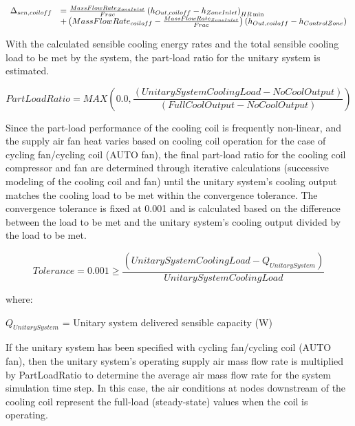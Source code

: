 \begin{equation}
  \begin{array}{rl}
    \Delta_{sen,coil off} &= \frac{MassFlowRate_{ZoneInlet}}{Frac} \PB{h_{Out,coil off} - h_{ZoneInlet}}_{HR\min} \\
                           &+ \PB{MassFlowRate_{coil off} - \frac{MassFlowRate_{ZoneInlet}}{Frac}} \PB{ h_{Out,coil off} - h_{ControlZone}}
  \end{array}
\end{equation}

With the calculated sensible cooling energy rates and the total sensible cooling load to be met by the system, the part-load ratio for the unitary system is estimated.

\begin{equation}
PartLoadRatio = MAX\left( {0.0,\frac{{\left( {UnitarySystemCoolingLoad - NoCoolOutput} \right)}}{{\left( {FullCoolOutput - NoCoolOutput} \right)}}} \right)
\end{equation}

Since the part-load performance of the cooling coil is frequently non-linear, and the supply air fan heat varies based on cooling coil operation for the case of cycling fan/cycling coil (AUTO fan), the final part-load ratio for the cooling coil compressor and fan are determined through iterative calculations (successive modeling of the cooling coil and fan) until the unitary system's cooling output matches the cooling load to be met within the convergence tolerance. The convergence tolerance is fixed at 0.001 and is calculated based on the difference between the load to be met and the unitary system's cooling output divided by the load to be met.

\begin{equation}
Tolerance = 0.001 \ge \frac{{\left( {UnitarySystemCoolingLoad - {Q_{UnitarySystem}}} \right)}}{{UnitarySystemCoolingLoad}}
\end{equation}

where:

\({Q_{UnitarySystem}}\) = Unitary system delivered sensible capacity (W)

If the unitary system has been specified with cycling fan/cycling coil (AUTO fan), then the unitary system's operating supply air mass flow rate is multiplied by PartLoadRatio to determine the average air mass flow rate for the system simulation time step. In this case, the air conditions at nodes downstream of the cooling coil represent the full-load (steady-state) values when the coil is operating.

